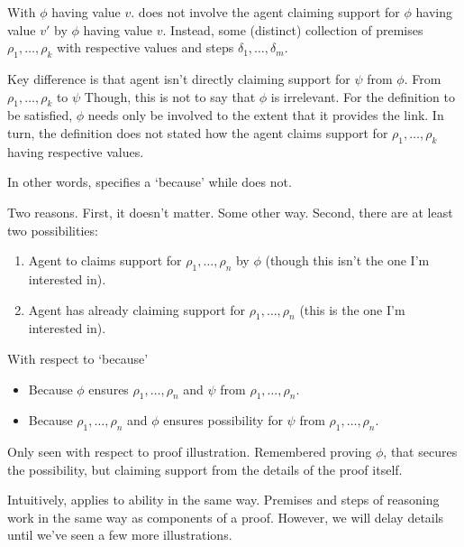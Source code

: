 \begin{note}
  With \adA{} \(\phi\) having value \(v\).
  \adB{} does not involve the agent claiming support for \(\phi\) having value \(v'\) by \(\phi\) having value \(v\).
  Instead, some (distinct) collection of premises \(\rho_{1},\dots,\rho_{k}\) with respective values and steps \(\delta_{1},\dots,\delta_{m}\).

  Key difference is that agent isn't directly claiming support for \(\psi\) from \(\phi\).
  From \(\rho_{1},\dots,\rho_{k}\) to \(\psi\)
  Though, this is not to say that \(\phi\) is irrelevant.
  For the definition to be satisfied, \(\phi\) needs only be involved to the extent that it provides the link.
  In turn, the definition does not stated how the agent claims support for \(\rho_{1},\dots,\rho_{k}\) having respective values.

  In other words, \adA{} specifies a `because' while \adB{} does not.

  Two reasons.
  First, it doesn't matter.
  Some other way.
  Second, there are at least two possibilities:

  \begin{enumerate}
  \item Agent to claims support for \(\rho_{1},\dots,\rho_{n}\) by \(\phi\) (though this isn't the one I'm interested in).
  \item Agent has already claiming support for \(\rho_{1},\dots,\rho_{n}\) (this is the one I'm interested in).
  \end{enumerate}

  With respect to `because'
  \begin{itemize}
  \item Because \(\phi\) ensures \(\rho_{1},\dots,\rho_{n}\) and \(\psi\) from \(\rho_{1},\dots,\rho_{n}\).
  \item Because \(\rho_{1},\dots,\rho_{n}\) and \(\phi\) ensures possibility for \(\psi\) from \(\rho_{1},\dots,\rho_{n}\).
  \end{itemize}
\end{note}


\begin{note}
  Only seen \adB{} with respect to proof illustration.
  Remembered proving \(\phi\), that secures the possibility, but claiming support from the details of the proof itself.

  Intuitively, applies to ability in the same way.
  Premises and steps of reasoning work in the same way as components of a proof.
  However, we will delay details until we've seen a few more illustrations.
\end{note}

